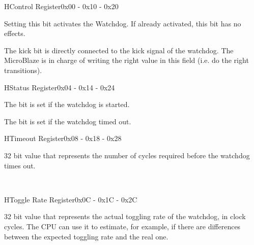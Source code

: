 \begin{center}
\begin{register}{H}{Control Register}{0x00 - 0x10 - 0x20}%
%
%
\begin{regdesc}\begin{reglist}
\item [start]Setting this bit activates the Watchdog. If already activated, this bit has no effects.
\item [kick]The kick bit is directly connected to the kick signal of the watchdog. The MicroBlaze is in charge of writing the right value in this field (i.e. do the right transitions).
\end{reglist}\end{regdesc}
\end{register}
\begin{register}{H}{Status Register}{0x04 - 0x14 - 0x24}%
%
%
\begin{regdesc}\begin{reglist}
\item [started]The bit is set if the watchdog is started.
\item [error]The bit is set if the watchdog timed out.
\end{reglist}\end{regdesc}
\end{register}
\begin{register}{H}{Timeout Register}{0x08 - 0x18 - 0x28}%
\begin{regdesc}\begin{reglist}
\item [Timeout]32 bit value that represents the number of cycles required before the watchdog times out.
\end{reglist}\end{regdesc}\
\end{register}
\begin{register}{H}{Toggle Rate Register}{0x0C - 0x1C - 0x2C}%
\regfieldb{Toggle Rate}{32}{0}%
\begin{regdesc}\begin{reglist}
\item [Toggle Rate]32 bit value that represents the actual toggling rate of the watchdog, in clock cycles. The CPU can use it to estimate, for example, if there are differences between the expected toggling rate and the real one.
\end{reglist}\end{regdesc}\
\end{register}
\end{center}

